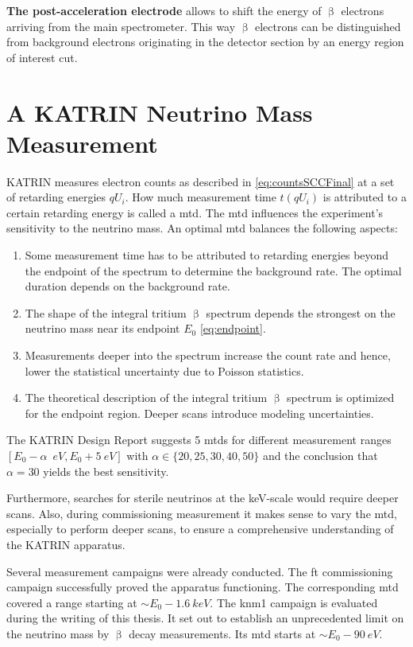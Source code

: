 {\par \textbf{The post-acceleration electrode} allows to shift the energy of $\upbeta$ electrons arriving from the main spectrometer. This way $\upbeta$ electrons can be distinguished from background electrons originating in the detector section by an energy region of interest cut.}



\section{A KATRIN Neutrino Mass Measurement}
KATRIN measures electron counts as described in \eqref{eq:countsSCCFinal} at a set of retarding energies ${qU_i}$. How much measurement time $t(qU_i)$ is attributed to a certain retarding energy is called a \gls{mtd}. The \gls{mtd} influences the experiment's sensitivity to the neutrino mass. An optimal \gls{mtd} balances the following aspects:
\begin{enumerate}
	\item Some measurement time has to be attributed to retarding energies beyond the endpoint of the spectrum to determine the background rate. The optimal duration depends on the background rate.
	\item The shape of the integral tritium $\upbeta$ spectrum depends the strongest on the neutrino mass near its endpoint $E_0$ \eqref{eq:endpoint}. 
	\item Measurements deeper into the spectrum increase the count rate and hence, lower the statistical uncertainty due to Poisson statistics.
	\item The theoretical description of the integral tritium $\upbeta$ spectrum is optimized for the endpoint region. Deeper scans introduce modeling uncertainties.
\end{enumerate}
The KATRIN Design Report \cite{Angrik:2005ep} suggests 5 \gls{mtd}s for different measurement ranges $[E_0-\alpha\;\SI{}{eV}, E_0 + \SI{5}{eV}]$ with $\alpha \in \{20, 25, 30, 40, 50\}$ and the conclusion that $\alpha=30$ yields the best sensitivity.

Furthermore, searches for sterile neutrinos at the keV-scale would require deeper scans. Also, during commissioning measurement it makes sense to vary the \gls{mtd}, especially to perform deeper scans, to ensure a comprehensive understanding of the KATRIN apparatus.

Several measurement campaigns were already conducted. The \gls{ft} commissioning campaign successfully proved the apparatus functioning. The corresponding \gls{mtd} covered a range starting at $\sim E_0-\SI{1.6}{keV}$. The \gls{knm1} campaign is evaluated during the writing of this thesis. It set out to establish an unprecedented limit on the neutrino mass by $\upbeta$ decay measurements. Its \gls{mtd} starts at $\sim E_0-\SI{90}{eV}$.